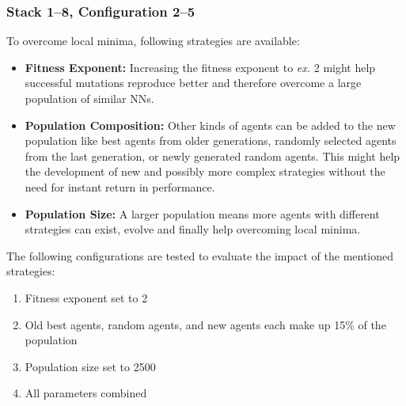 \documentclass[11pt]{report}
\begin{document}
\begin{enumerate}
    \subsubsection{Stack 1--8, Configuration 2--5}
    To overcome local minima, following strategies are available:
    \begin{itemize}
        \item \textbf{Fitness Exponent:} Increasing the fitness exponent to \textit{ex.} 2 might help successful mutations reproduce better and therefore overcome a large population of similar NNs.
        \item \textbf{Population Composition:} Other kinds of agents can be added to the new population like best agents from older generations, randomly selected agents from the last generation, or newly generated random agents.
        This might help the development of new and possibly more complex strategies without the need for instant return in performance.
        \item \textbf{Population Size:} A larger population means more agents with different strategies can exist, evolve and finally help overcoming local minima.
    \end{itemize}
    The following configurations are tested to evaluate the impact of the mentioned strategies:
    \begin{enumerate}
        \item Fitness exponent set to 2
        \item Old best agents, random agents, and new agents each make up 15\% of the population
        \item Population size set to 2500
        \item All parameters combined
    \end{enumerate}
    \begin{figure}[H]


\end{figure}
\end{enumerate}
\end{document}
